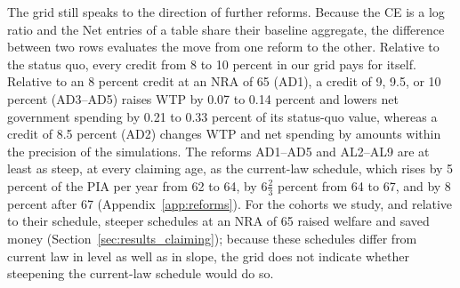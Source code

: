 The grid still speaks to the direction of further reforms. Because the CE is a log ratio and the Net entries of a table share their baseline aggregate, the difference between two rows evaluates the move from one reform to the other. Relative to the status quo, every credit from 8 to 10 percent in our grid pays for itself. Relative to an 8 percent credit at an NRA of 65 (AD1), a credit of 9, 9.5, or 10 percent (AD3--AD5) raises WTP by 0.07 to 0.14 percent and lowers net government spending by 0.21 to 0.33 percent of its status-quo value, whereas a credit of 8.5 percent (AD2) changes WTP and net spending by amounts within the precision of the simulations. %
The reforms AD1--AD5 and AL2--AL9 are at least as steep, at every claiming age, as the current-law schedule, which rises by 5 percent of the PIA per year from 62 to 64, by $6\tfrac{2}{3}$ percent from 64 to 67, and by 8 percent after 67 (Appendix~\ref{app:reforms}). %
For the cohorts we study, and relative to their schedule, steeper schedules at an NRA of 65 raised welfare and saved money (Section~\ref{sec:results_claiming}); because these schedules differ from current law in level as well as in slope, the grid does not indicate whether steepening the current-law schedule would do so.

